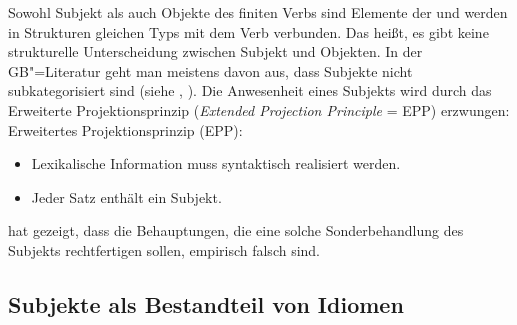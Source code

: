 % 
Sowohl Subjekt als auch Objekte des finiten Verbs sind Elemente der \compsl und werden in Strukturen
gleichen Typs mit dem Verb verbunden.
Das heißt, es gibt keine strukturelle Unterscheidung zwischen Subjekt und 
Objekten. In der GB"=Literatur geht man meistens
davon aus, dass Subjekte nicht subkategorisiert sind (siehe \zb {}, ).
Die Anwesenheit eines Subjekts wird durch das Erweiterte Projektionsprinzip (\emph{Extended Projection
Principle} = EPP) erzwungen:
\ea
Erweitertes Projektionsprinzip (EPP):
\begin{itemize}
\item Lexikalische Information muss syntaktisch realisiert werden.
\item Jeder Satz enthält ein Subjekt. 
\end{itemize}
\z

\noindent
\citet[Abschnitt~2]{Bresnan82c} hat gezeigt, dass die Behauptungen,
die eine solche Sonderbehandlung des Subjekts rechtfertigen sollen, empirisch falsch sind.


\subsection{Subjekte als Bestandteil von Idiomen}


